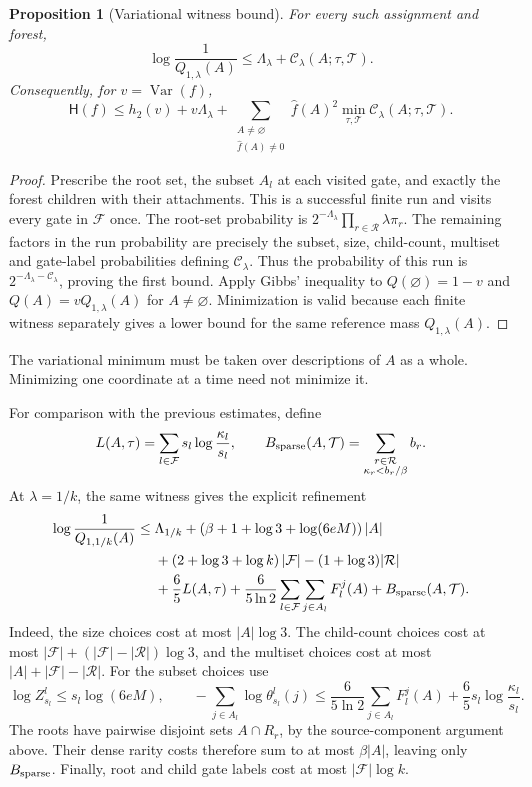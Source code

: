 \documentclass[11pt]{amsart}
\newtheorem{proposition}[theorem]{Proposition}
\theoremstyle{definition}
\theoremstyle{remark}
\newcommand{\HH}{\mathsf H}
\newcommand{\wh}[1]{\widehat{#1}}
\begin{document}
\begin{proposition}[Variational witness bound]\label{prop:joint-witness}
For every such assignment and forest,
\[
 \log\frac1{Q_{1,\lambda}(A)}
 \le\Lambda_\lambda+\mathcal C_\lambda(A;\tau,\mathcal T).
\]
Consequently, for $v=\operatorname{Var}(f)$,
\[
 \HH(f)\le h_2(v)+v\Lambda_\lambda+
 \sum_{\substack{A\ne\varnothing\\\wh f(A)\ne0}}\wh f(A)^2
       \min_{\tau,\mathcal T}\mathcal C_\lambda(A;\tau,\mathcal T).
\]
\end{proposition}
\begin{proof}
Prescribe the root set, the subset $A_l$ at each visited gate, and exactly
the forest children with their attachments. This is a successful finite
run and visits every gate in $\mathcal F$ once.
The root-set probability is
$2^{-\Lambda_\lambda}\prod_{r\in\mathcal R}\lambda\pi_r$.
The remaining factors in the run probability are precisely the subset,
size, child-count, multiset and gate-label probabilities defining
$\mathcal C_\lambda$. Thus the probability of this run is
$2^{-\Lambda_\lambda-\mathcal C_\lambda}$, proving the first bound.
Apply Gibbs' inequality to
$Q(\varnothing)=1-v$ and
$Q(A)=vQ_{1,\lambda}(A)$ for $A\ne\varnothing$.
Minimization is valid because each finite witness separately gives a
lower bound for the same reference mass $Q_{1,\lambda}(A)$.
\end{proof}

The variational minimum must be taken over descriptions of $A$ as a
whole. Minimizing one coordinate at a time need not minimize it.

For comparison with the previous estimates, define
\[
 L(A,\tau)=\sum_{l\in\mathcal F}s_l\log\frac{\kappa_l}{s_l},
 \qquad
 B_{\rm sparse}(A,\mathcal T)
 =\sum_{\substack{r\in\mathcal R\\\kappa_r<b_r/\beta}}b_r.
\]
At $\lambda=1/k$, the same witness gives the explicit refinement
\begin{align*}
 \log\frac1{Q_{1,1/k}(A)}
 \le{}&\Lambda_{1/k}
 +\left(\beta+1+\log3+\log(6eM)\right)|A|\\
 &+\left(2+\log3+\log k\right)|\mathcal F|
   -(1+\log3)|\mathcal R|\\
 &+\frac65L(A,\tau)
   +\frac{6}{5\ln2}\sum_{l\in\mathcal F}\sum_{j\in A_l}F_l^j(A)
   +B_{\rm sparse}(A,\mathcal T).
\end{align*}
Indeed, the size choices cost at most $|A|\log3$.
The child-count choices cost at most
$|\mathcal F|+(|\mathcal F|-|\mathcal R|)\log3$,
and the multiset choices cost at most
$|A|+|\mathcal F|-|\mathcal R|$.
For the subset choices use
\[
 \log Z_{s_l}^l\le s_l\log(6eM),\qquad
 -\sum_{j\in A_l}\log\theta_{s_l}^l(j)
 \le\frac{6}{5\ln2}\sum_{j\in A_l}F_l^j(A)
       +\frac65s_l\log\frac{\kappa_l}{s_l}.
\]
The roots have pairwise disjoint sets $A\cap R_r$, by the source-component
argument above. Their dense rarity costs therefore sum to at most
$\beta|A|$, leaving only $B_{\rm sparse}$.
Finally, root and child gate labels cost at most
$|\mathcal F|\log k$.
\end{document}
